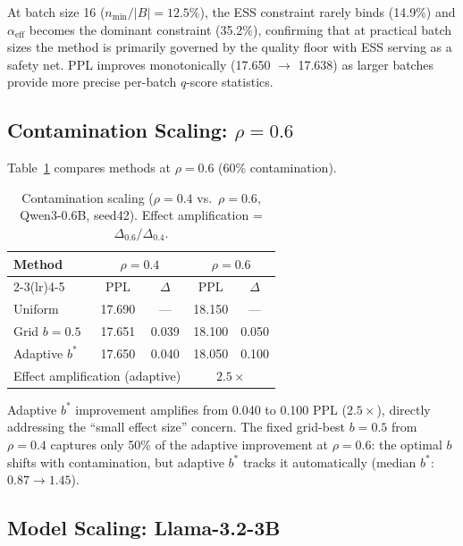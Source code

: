 \documentclass[11pt,a4paper]{article}
\newcommand{\bstar}{b^{*}}
\newcommand{\aeff}{\alpha_{\mathrm{eff}}}
\newcommand{\nmin}{n_{\min}}
\begin{document}
At batch size 16 ($\nmin/|B| = 12.5\%$), the ESS constraint rarely binds (14.9\%) and $\aeff$ becomes the dominant constraint (35.2\%), confirming that at practical batch sizes the method is primarily governed by the quality floor with ESS serving as a safety net.
PPL improves monotonically (17.650 $\to$ 17.638) as larger batches provide more precise per-batch $q$-score statistics.


\subsection{Contamination Scaling: $\rho = 0.6$}
\label{sec:rho06}

Table~\ref{tab:rho06} compares methods at $\rho = 0.6$ (60\% contamination).

\begin{table}[t]
\centering
\small
\caption{Contamination scaling ($\rho{=}0.4$ vs.\ $\rho{=}0.6$, Qwen3-0.6B, seed42). Effect amplification = $\Delta_{0.6} / \Delta_{0.4}$.}
\label{tab:rho06}
\begin{tabular}{lcccc}
\toprule
\textbf{Method} & \multicolumn{2}{c}{$\rho{=}0.4$} & \multicolumn{2}{c}{$\rho{=}0.6$} \\
\cmidrule(lr){2-3}\cmidrule(lr){4-5}
& PPL & $\Delta$ & PPL & $\Delta$ \\
\midrule
Uniform       & 17.690 & ---    & 18.150 & --- \\
Grid $b{=}0.5$ & 17.651 & 0.039  & 18.100 & 0.050 \\
Adaptive $\bstar$ & 17.650 & 0.040  & 18.050 & 0.100 \\
\midrule
\multicolumn{3}{l}{Effect amplification (adaptive)} & \multicolumn{2}{c}{$2.5\times$} \\
\bottomrule
\end{tabular}
\end{table}

Adaptive $\bstar$ improvement amplifies from 0.040 to 0.100 PPL ($2.5\times$), directly addressing the ``small effect size'' concern.
The fixed grid-best $b{=}0.5$ from $\rho{=}0.4$ captures only 50\% of the adaptive improvement at $\rho{=}0.6$: the optimal $b$ shifts with contamination, but adaptive $\bstar$ tracks it automatically (median $\bstar$: $0.87 \to 1.45$).


\subsection{Model Scaling: Llama-3.2-3B}
\label{sec:3b}
\end{document}
